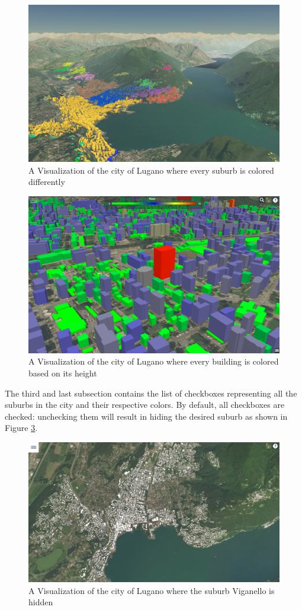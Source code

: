 \begin{figure} [H]
\centering
\includegraphics[width=.8\textwidth]{chapter4/images/application_bySuburb}
\caption{A Visualization of the city of Lugano where every suburb is colored differently}
\label{fig:application_bySuburb}
\end{figure}
\begin{figure} [H]
\centering
\includegraphics[width=.8\textwidth]{chapter4/images/application_byHeight}
\caption{A Visualization of the city of Lugano where every building is colored based on its height}
\label{fig:application_byHeight}
\end{figure}
The third and last subsection contains the list of checkboxes representing all the suburbs in the city and their respective colors. By default, all checkboxes are checked: unchecking them will result in hiding the desired suburb as shown in Figure \ref{fig:application_showSuburb}.
\begin{figure} [H]
\centering
\includegraphics[width=.8\textwidth]{chapter4/images/application_showSuburb}
\caption{A Visualization of the city of Lugano where the suburb Viganello is hidden}
\label{fig:application_showSuburb}
\end{figure}

